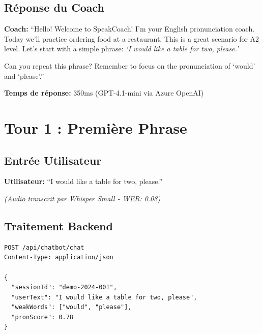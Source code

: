 \documentclass[12pt,a4paper,oneside]{report}
\begin{document}
\subsection{Réponse du Coach}

\begin{tcolorbox}[colback=coachgreen!10, colframe=coachgreen, title=Coach IA - Accueil]
\textbf{Coach:} ``Hello! Welcome to SpeakCoach! I'm your English pronunciation coach. 
Today we'll practice ordering food at a restaurant. This is a great scenario for A2 level. 
Let's start with a simple phrase: \textit{`I would like a table for two, please.'}

Can you repeat this phrase? Remember to focus on the pronunciation of `would' and `please'.''
\end{tcolorbox}

\vspace{0.5cm}

\textbf{Temps de réponse:} 350ms (GPT-4.1-mini via Azure OpenAI)

\section{Tour 1 : Première Phrase}

\subsection{Entrée Utilisateur}

\begin{tcolorbox}[colback=userblue!10, colframe=userblue, title=Utilisateur - Tentative 1]
\textbf{Utilisateur:} ``I would like a table for two, please.''

\textit{(Audio transcrit par Whisper Small - WER: 0.08)}
\end{tcolorbox}

\subsection{Traitement Backend}

\begin{lstlisting}[caption=Traitement de la réponse utilisateur,label=lst:process_response]
POST /api/chatbot/chat
Content-Type: application/json

{
  "sessionId": "demo-2024-001",
  "userText": "I would like a table for two, please",
  "weakWords": ["would", "please"],
  "pronScore": 0.78
}
\end{lstlisting}
\end{document}

